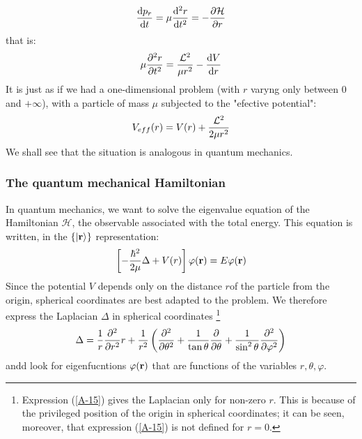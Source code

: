 \begin{equation}\label{A-12a}
	\dv{p_r}{t}=\mu\dv[2]{r}{t}=-\pdv{\mathcal{H}}{r}
\end{equation}
that is:
\begin{equation}\label{A-12b}
	\mu\pdv[2]{r}{t}=\frac{\vb{\mathcal{L}}^2}{\mu r^2}-\dv{V}{r}
\end{equation}
It is just as if we had a one-dimensional problem (with $r$ varyng only between $0$ and $+\infty$), with a particle of mass $\mu$ subjected to the "efective potential":
\begin{equation}\label{A-13}
	V_{eff}(r)=V(r)+\frac{\vb{\mathcal{L}}^2}{2\mu r^2}
\end{equation}
We shall see that the situation is analogous in quantum mechanics.


\subsubsection{The quantum mechanical Hamiltonian}
In quantum mechanics, we want to solve the eigenvalue equation of the Hamiltonian $\mathcal{H}$, the observable associated with the total energy. This equation is written, in the $\{\ket{\vb{r}}\}$ representation:
\begin{equation}\label{A-14}
	\left[-\frac{\hbar^2}{2\mu}\Delta +V(r)\right]\varphi(\vb{r}) = E\varphi(\vb{r})
\end{equation}
Since the potential $V$ depends only on the distance  $r $of the particle from the origin, spherical coordinates are best adapted to the problem. We therefore express the Laplacian $\Delta$ in spherical coordinates \footnote{Expression (\ref{A-15}) gives the Laplacian only for non-zero $r$. This is because of the privileged position of the origin in spherical coordinates; it can be seen, moreover, that expression (\ref{A-15}) is not defined for $r=0$.}
\begin{equation}\label{A-15}
	\Delta = \frac{1}{r}\pdv[2]{r}r+\frac{1}{r^2}\left(\pdv[2]{\theta} +\frac{1}{\tan\theta}\pdv{\theta}+\frac{1}{\sin^2\theta}\pdv[2]{\varphi}\right)
\end{equation}
andd look for eigenfucntions $\varphi(\vb{r})$ that are functions of the variables $r,\theta,\varphi$.















